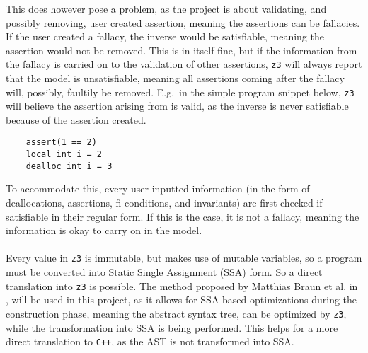 This does however pose a problem, as the project is about validating, and possibly removing,
user created assertion, meaning the assertions can be fallacies. If the user created a fallacy,
the inverse
would be satisfiable, meaning the assertion would not be removed. This is in itself fine, but if
the information from the fallacy is carried on to the validation of other assertions, \texttt{z3}
will always report that the model is unsatisfiable, meaning all assertions coming after the fallacy
will, possibly, faultily be removed. E.g.\ in the simple program snippet below, \texttt{z3} will
believe the assertion arising from  is valid, as the
inverse is never satisfiable because of the assertion created.

\begin{lstlisting}
    assert(1 == 2)
    local int i = 2
    dealloc int i = 3
\end{lstlisting}
\noindent
To accommodate this, every user inputted information (in the form of deallocations, assertions,
fi-conditions, and invariants) are first checked if satisfiable in their regular form. If this is
the case, it is not a fallacy, meaning the information is okay to carry on in the model.
\\
\\
Every value in \texttt{z3} is immutable, but \lan makes use of mutable variables, so a \lan program
must be converted into Static Single Assignment (SSA) form. So a direct translation into
\texttt{z3} is possible. The method proposed by Matthias Braun et al. in \cite{SSA}, will be used
in this project, as it allows for SSA-based optimizations during the construction phase, meaning
the abstract syntax tree, can be optimized by \texttt{z3}, while the transformation into SSA is
being performed. This helps for a more direct translation to \texttt{C++}, as the AST is not
transformed into SSA.

